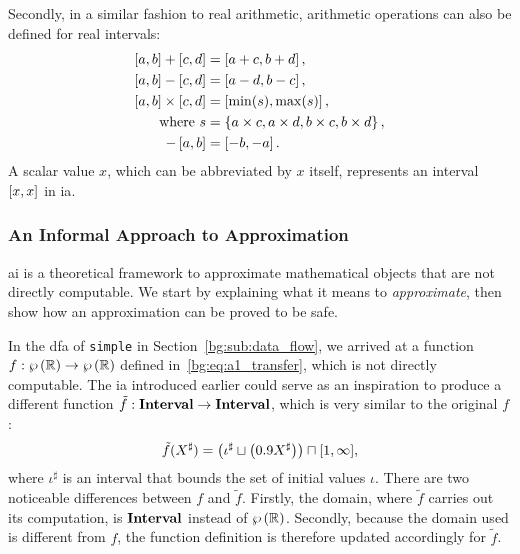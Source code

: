 Secondly, in a similar fashion to real arithmetic, arithmetic operations can
also be defined for real intervals:
\begin{equation}
    \begin{aligned}
        \left[{a}, {b}\right] + \left[{c}, {d}\right] &= \left[{a + c}, {b + d}\right], \\
        \left[{a}, {b}\right] - \left[{c}, {d}\right] &= \left[{a - d}, {b - c}\right], \\
        \left[{a}, {b}\right] \times \left[{c}, {d}\right]
            &= \left[{\min(s)}, {\max(s)}\right], \\
        \text{where~} s &= \left\{
            a \times c, a \times d, b \times c, b \times d
        \right\}, \\
        -\left[{a}, {b}\right] &= \left[{-b}, {-a}\right].
    \end{aligned}
    \label{bg:eq:interval_operations}
\end{equation}
A scalar value $x$, which can be abbreviated by $x$ itself, represents an
interval $\left[{x}, {x}\right]$ in \gls{ia}.

\subsubsection{An Informal Approach to Approximation}
\label{bg:ssub:informal}

\Gls{ai} is a theoretical framework to approximate mathematical objects
that are not directly computable.  We start by explaining what it means to
\emph{approximate}, then show how an approximation can be proved to be safe.

In the \gls{dfa} of \verb|simple| in Section~\ref{bg:sub:data_flow}, we
arrived at a function $f: \wp\left({\mathbb{R}}\right) \to \wp\left({\mathbb{R}}\right)$ defined
in~\eqref{bg:eq:a1_transfer}, which is not directly computable.  The \gls{ia}
introduced earlier could serve as an inspiration to produce a different
function $\tilde{f}: \mathbf{Interval} \to \mathbf{Interval}$, which is very similar to
the original $f$:
\begin{equation}
    \tilde{f}(X^\sharp) = \left(
        \iota^\sharp \sqcup \left( 0.9 X^\sharp \right)
    \right) \sqcap [1, \infty],
    \label{bg:eq:a1_transfer_interval}
\end{equation}
where $\iota^\sharp$ is an interval that bounds the set of initial values
$\iota$.  There are two noticeable differences between $f$ and $\tilde{f}$.
Firstly, the domain, where $\tilde{f}$ carries out its computation, is
$\mathbf{Interval}$ instead of $\wp\left({\mathbb{R}}\right)$.  Secondly, because the domain
used is different from $f$, the function definition is therefore updated
accordingly for $\tilde{f}$.

